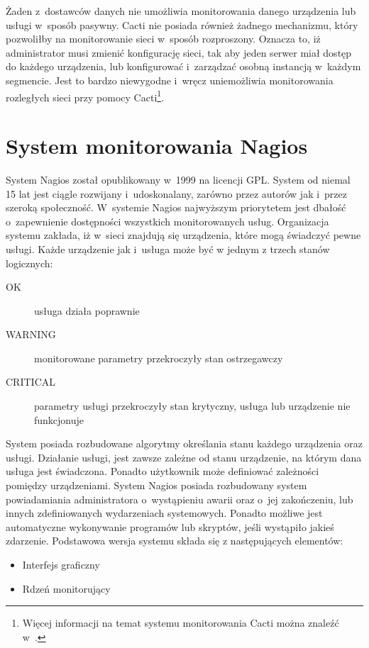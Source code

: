 Żaden z~dostawców danych nie umożliwia monitorowania danego urządzenia
lub usługi w~sposób pasywny. Cacti nie posiada również żadnego
mechanizmu, który pozwoliłby na monitorowanie sieci w~sposób
rozproszony. Oznacza to, iż administrator musi zmienić konfigurację
sieci, tak aby jeden serwer miał dostęp do każdego urządzenia, lub
konfigurować i~zarządzać osobną instancją w~każdym segmencie. Jest to
bardzo niewygodne i~wręcz uniemożliwia monitorowania rozległych sieci
przy pomocy Cacti\footnote{Więcej informacji na temat systemu
  monitorowania Cacti można znaleźć w~\cite{www:Cacti}.}.

\section[Nagios][System monitorowania Nagios]{System monitorowania Nagios}

System Nagios został opublikowany w~1999 na licencji GPL. System od
niemal 15 lat jest ciągle rozwijany i~udoskonalany, zarówno przez
autorów jak i~przez szeroką społeczność. W~systemie Nagios najwyższym
priorytetem jest dbałość o~zapewnienie dostępności wszystkich
monitorowanych usług. Organizacja systemu zakłada, iż w~sieci znajdują
się urządzenia, które mogą świadczyć pewne usługi. Każde urządzenie
jak i~usługa może być w jednym z trzech stanów logicznych:

\begin{description}
\item[OK] usługa działa poprawnie
\item[WARNING] monitorowane parametry przekroczyły stan ostrzegawczy
\item[CRITICAL] parametry usługi przekroczyły stan krytyczny, usługa
  lub urządzenie nie funkcjonuje
\end{description}

System posiada rozbudowane algorytmy określania stanu każdego
urządzenia oraz usługi. Działanie usługi, jest zawsze zależne od stanu
urządzenie, na którym dana usługa jest świadczona. Ponadto użytkownik
może definiować zależności pomiędzy urządzeniami. System Nagios
posiada rozbudowany system powiadamiania administratora o~wystąpieniu
awarii oraz o~jej zakończeniu, lub innych zdefiniowanych wydarzeniach
systemowych. Ponadto możliwe jest automatyczne wykonywanie programów
lub skryptów, jeśli wystąpiło jakieś zdarzenie. Podstawowa wersja
systemu składa się z następujących elementów:

\begin{itemize}
\item Interfejs graficzny
\item Rdzeń monitorujący
\end{itemize}

